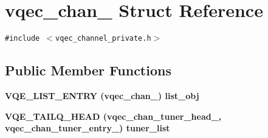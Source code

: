\section{vqec\_\-chan\_\- Struct Reference}
\label{structvqec__chan__}
{\tt \#include $<$vqec\_\-channel\_\-private.h$>$}

\subsection*{Public Member Functions}
\begin{CompactItemize}
\item 
\bf{VQE\_\-LIST\_\-ENTRY} (\bf{vqec\_\-chan\_\-}) list\_\-obj
\item 
\bf{VQE\_\-TAILQ\_\-HEAD} (vqec\_\-chan\_\-tuner\_\-head\_\-, \bf{vqec\_\-chan\_\-tuner\_\-entry\_\-}) tuner\_\-list
\end{CompactItemize}
